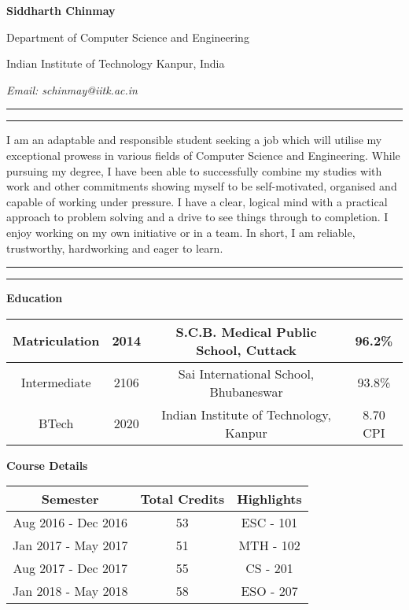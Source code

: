 \documentclass{article}
\begin{document}
\textbf{Siddharth Chinmay}
\par
Department of Computer Science and Engineering
\par
Indian Institute of Technology Kanpur, India
\par
\textit{Email: schinmay@iitk.ac.in}
\vspace{0.5cm}
\hrule
\vspace{0.1cm}
\hrule
\vspace{0.1cm}
\noindent
I am an adaptable and responsible student	seeking a job which will utilise my exceptional prowess in various fields of Computer Science and Engineering. While pursuing my degree, I have been able to successfully combine my studies with work and other commitments showing myself to be self-motivated, organised and capable of working under pressure. I have a clear, logical mind with a practical approach to problem solving and a drive to see things through to completion. I enjoy working on my own initiative or in a team. In short, I am reliable, trustworthy, hardworking and eager to learn.
\vspace{0.1cm}
\hrule
\vspace{0.1cm}
\hrule
\vspace{0.5cm}
\textbf{Education}
\vspace{0.5cm}
\\
\begin{tabular}{ |c|c|c|c| } 
\hline
Matriculation & 2014 & S.C.B. Medical Public School, Cuttack & 96.2\% \\ 
\hline
Intermediate & 2106 & Sai International School, Bhubaneswar & 93.8\% \\ 
\hline
BTech & 2020 & Indian Institute of Technology, Kanpur & 8.70 CPI \\ 
\hline
\end{tabular}
\vspace{0.5cm}
\par
\textbf{Course Details}
\vspace{0.5cm}
\\
\begin{tabular}{ |c|c|c| } 
\hline
\textbf{Semester} & \textbf{Total Credits} & \textbf{Highlights} \\ 
\hline
Aug 2016 - Dec 2016 & 53 & ESC - 101 \\ 
\hline
Jan 2017 - May 2017 & 51 & MTH - 102 \\ 
\hline
Aug 2017 - Dec 2017 & 55 & CS - 201 \\ 
\hline
Jan 2018 - May 2018 & 58 & ESO - 207 \\ 
\hline
\end{tabular}
\end{document}
